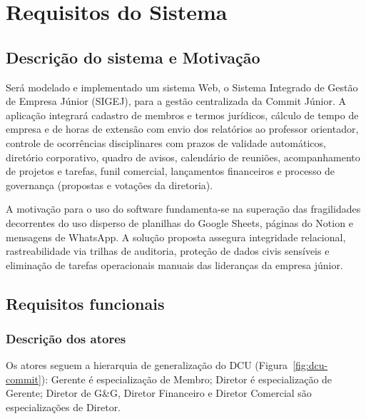 \chapter{Requisitos do Sistema}
\label{cap:requisitos}

\section{Descrição do sistema e Motivação}
Será modelado e implementado um sistema Web, o Sistema Integrado de Gestão de Empresa Júnior (SIGEJ), para a gestão centralizada da Commit Júnior. A aplicação integrará cadastro de membros e termos jurídicos, cálculo de tempo de empresa e de horas de extensão com envio dos relatórios ao professor orientador, controle de ocorrências disciplinares com prazos de validade automáticos, diretório corporativo, quadro de avisos, calendário de reuniões, acompanhamento de projetos e tarefas, funil comercial, lançamentos financeiros e processo de governança (propostas e votações da diretoria).

A motivação para o uso do software fundamenta-se na superação das fragilidades decorrentes do uso disperso de planilhas do Google Sheets, páginas do Notion e mensagens de WhatsApp. A solução proposta assegura integridade relacional, rastreabilidade via trilhas de auditoria, proteção de dados civis sensíveis e eliminação de tarefas operacionais manuais das lideranças da empresa júnior.

\section{Requisitos funcionais}

\subsection{Descrição dos atores}

Os atores seguem a hierarquia de generalização do DCU (Figura~\ref{fig:dcu-commit}): Gerente é especialização de Membro; Diretor é especialização de Gerente; Diretor de G\&G, Diretor Financeiro e Diretor Comercial são especializações de Diretor.

